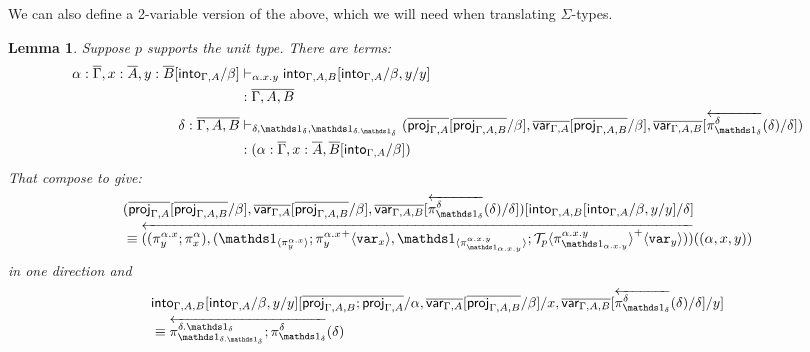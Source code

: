 \documentclass[10pt]{article}
\newtheorem{lemma}{Lemma}
\theoremstyle{definition}
\newcommand{\yields}{\vdash}
\newcommand{\rewrite}[2]{\overleftarrow{#1}(#2)}
\newcommand\ApEl[2]{\mathcal{T}_{#1}\langle#2\rangle}
\newcommand\ApPlus[2]{\ensuremath{{#1}^+ \langle #2 \rangle }}
\begin{document}
We can also define a 2-variable version of the above, which we will need when translating $\Sigma$-types. 
\begin{lemma}\label{lem:double-into}
Suppose $p$ supports the unit type.  There are terms:
\begin{align*}
\alpha : \upstairs{\Gamma}, x : \upstairs{A}, y : \upstairs{B}[\into{\Gamma, A} /\beta] &\yields_{\alpha.x.y} \into{\Gamma, A, B}[\into{\Gamma, A}/\beta, y/y] \\&: \upstairs{\Gamma,A,B} \\
\delta :\upstairs{\Gamma, A, B} &\yields_{\delta, \One_\delta, \One_{\delta.\One_\delta}} (\upstairs{\proj{\Gamma, A}}[\upstairs{\proj{\Gamma, A, B}}/\beta], \upstairs{\qvar{\Gamma, A}}[\upstairs{\proj{\Gamma, A, B}}/\beta], \upstairs{\qvar{\Gamma, A, B}}[\rewrite{\pi^\delta_{\One_\delta}}{\delta}/\delta]) \\&: (\alpha : \upstairs{\Gamma}, x : \upstairs{A},  \upstairs{B}[\into{\Gamma, A}/\beta])
\end{align*}
That compose to give:
\begin{align*}
&(\upstairs{\proj{\Gamma, A}}[\upstairs{\proj{\Gamma, A, B}}/\beta], \upstairs{\qvar{\Gamma, A}}[\upstairs{\proj{\Gamma, A, B}}/\beta], \upstairs{\qvar{\Gamma, A, B}}[\rewrite{\pi^\delta_{\One_\delta}}{\delta}/\delta])[\into{\Gamma, A, B}[\into{\Gamma, A}/\beta, y/y]/\delta] \\
&\equiv \rewrite{((\pi^{\alpha.x}_y;\pi^\alpha_x), (\ApOne{\pi^{\alpha.x}_y};\ApPlus{\pi^{\alpha.x}_y}{\var{x}}, \ApOne{\pi^{\alpha.x.y}_{\One_{\alpha.x.y}}};\ApPlus{\ApEl{p}{\pi^{\alpha.x.y}_{\One_{\alpha.x.y}}}}{\var{y}}))}{(\alpha, x,y)}
\end{align*}
in one direction and
\begin{align*}
&\into{\Gamma, A, B}[\into{\Gamma, A}/\beta, y/y][\upstairs{\proj{\Gamma, A, B};\proj{\Gamma, A}}/\alpha, \upstairs{\qvar{\Gamma, A}}[\upstairs{\proj{\Gamma, A, B}}/\beta]/x, \upstairs{\qvar{\Gamma, A, B}}[\rewrite{\pi^\delta_{\One_\delta}}{\delta}/\delta]/y] \\
&\equiv \rewrite{\pi^{\delta.\One_\delta}_{\One_{\delta.\One_\delta}};\pi^{\delta}_{\One_{\delta}}}{\delta}
\end{align*}
\end{lemma}
\end{document}
